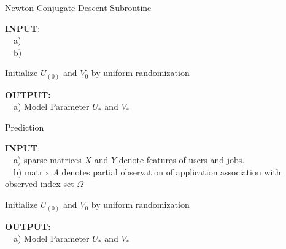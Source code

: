 \documentclass{article} %
\begin{document}
\begin{algorithm}
    \caption{Newton Conjugate Descent Subroutine}
    \label{alg:newton}
    \begin{algorithmic}[1]

\State \textbf{INPUT}: \\ \ \ a) 
\\ \ \ b) 
\State \

\State Initialize $U_{(0)}$ and $V_{0}$ by uniform randomization
\State \

\State \textbf{OUTPUT: } \\ 
\ \ a) Model Parameter $ U_{*}$ and $V_{*}$ 
\end{algorithmic}
\end{algorithm}

\begin{algorithm}
    \caption{Prediction}
    \label{alg:prec}
    \begin{algorithmic}[1]

\State \textbf{INPUT}: \\ \ \ a) sparse matrices $X$ and $Y$ denote features of users
and jobs. \\ \ \ b) matrix $A$ denotes partial observation of application
association with observed index set $\Omega$
\State \

\State Initialize $U_{(0)}$ and $V_{0}$ by uniform randomization
\State \

\State \textbf{OUTPUT: } \\ 
\ \ a) Model Parameter $ U_{*}$ and $V_{*}$ 
\end{algorithmic}
\end{algorithm}
\end{document}
